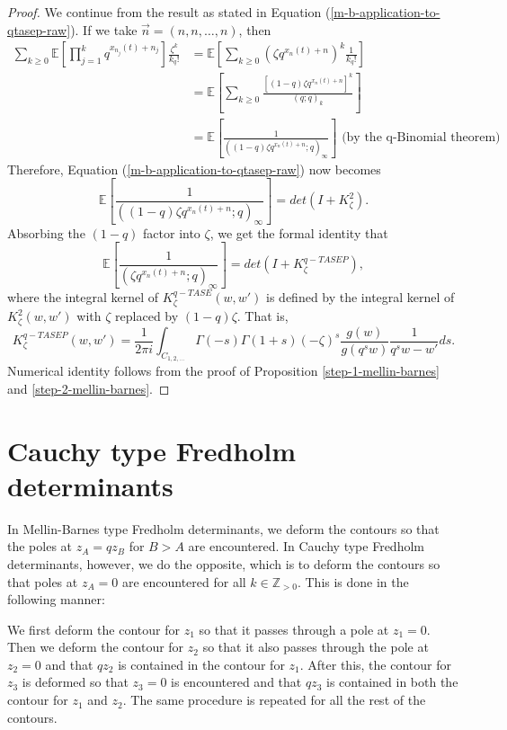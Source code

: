 \begin{proof}
We continue from the result as stated in Equation (\ref{m-b-application-to-qtasep-raw}). If we take $\vec{n} = (n,n,\dots,n)$, then 
\begin{align*}
\sum_{k \ge 0} \mathbb{E} \left[ \prod_{j=1}^k q^{x_{n_j}(t)+n_j} \right] \frac{\zeta^k}{k_q!} &= \mathbb{E} \left[ \sum_{k \ge 0} (\zeta q^{x_n(t) + n})^k \frac{1}{k_q!} \right]\\
&= \mathbb{E} \left[ \sum_{k \ge 0} \frac{[(1-q) \zeta q^{x_n(t) + n}]^k}{(q;q)_k} \right]\\
&= \mathbb{E} \left[ \frac{1}{( (1-q) \zeta q^{x_n(t) + n} ;q)_{\infty}} \right] \text{ (by the q-Binomial theorem) }
\end{align*}
Therefore, Equation (\ref{m-b-application-to-qtasep-raw}) now becomes $$\mathbb{E} \left[ \frac{1}{( (1-q) \zeta q^{x_n(t) + n} ;q)_{\infty}} \right] = det(I+K^2_{\zeta}).$$
Absorbing the $(1-q)$ factor into $\zeta$, we get the formal identity that $$\mathbb{E} \left[ \frac{1}{(\zeta q^{x_n(t)+n}; q)_{\infty}} \right] = det(I+K_{\zeta}^{q-TASEP}),$$ where the integral kernel of $K^{q-TASE}_{\zeta} (w,w')$ is defined by the integral kernel of $K^2_{\zeta}(w,w')$ with $\zeta$ replaced by $(1-q)\zeta$. That is, $$K_{\zeta}^{q-TASEP} (w, w') = \frac{1}{2 \pi i} \int_{C_{1,2, \dots}} \Gamma(-s) \Gamma(1+s) (-\zeta)^s \frac{g(w)}{g(q^s w)} \frac{1}{q^s w - w'}ds.$$
Numerical identity follows from the proof of Proposition \ref{step-1-mellin-barnes} and \ref{step-2-mellin-barnes}.
\end{proof}

\section{Cauchy type Fredholm determinants}
In Mellin-Barnes type Fredholm determinants, we deform the contours so that the poles at $z_A = qz_B$ for $B > A$ are encountered. In Cauchy type Fredholm determinants, however, we do the opposite, which is to deform the contours so that poles at $z_A = 0$ are encountered for all $k \in \mathbb{Z}_{>0}$. This is done in the following manner:

We first deform the contour for $z_1$ so that it passes through a pole at $z_1 = 0$. Then we deform the contour for $z_2$ so that it also passes through the pole at $z_2 = 0$ and that $qz_2$ is contained in the contour for $z_1$. After this, the contour for $z_3$ is deformed so that $z_3 = 0$ is encountered and that $qz_3$ is contained in both the contour for $z_1$ and $z_2$. The same procedure is repeated for all the rest of the contours.

